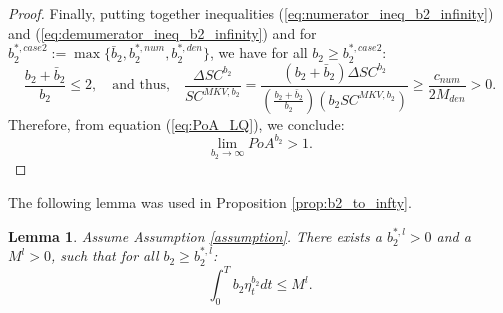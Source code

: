 \documentclass[11pt]{article}
\newtheorem{lemma}{Lemma}
\begin{document}
\begin{proof}
		
	Finally, putting together inequalities (\ref{eq:numerator_ineq_b2_infinity}) and (\ref{eq:demumerator_ineq_b2_infinity}) and for $b_2^{*,case 2} := \max \{ \bar{b}_2,  b_2^{*,num}, b_2^{*,den} \}$, we have for all $b_2 \geq b_2^{*,case 2}$:
	\begin{equation*}
		\frac{b_2+\bar{b}_2}{b_2} \leq 2, \quad \text{and thus,} \quad \frac{\Delta SC^{b_2}}{SC^{MKV,b_2}} = \frac{(b_2 + \bar{b}_2) \Delta SC^{b_2} }{\left(\frac{b_2 + \bar{b}_2}{b_2} \right) (b_2 SC^{MKV,b_2} ) } \geq \frac{c_{num}}{ 2 M_{den}} > 0.
	\end{equation*}
	Therefore, from equation (\ref{eq:PoA_LQ}), we conclude: 
	$$ \lim_{b_2 \to \infty} PoA^{b_2} > 1.$$ 
\end{proof}


The following lemma was used in Proposition \ref{prop:b2_to_infty}.
\begin{lemma}
	Assume Assumption \ref{assumption}. There exists a $b_2^{*,l}>0$ and a $M^l>0$, such that for all $b_2 \geq b_2^{*,l}$:
	$$\int_0^T b_2 \eta^{b_2}_t dt \leq M^l.$$
	\label{lemma:int_b2_eta_t}
\end{lemma}
\end{document}
